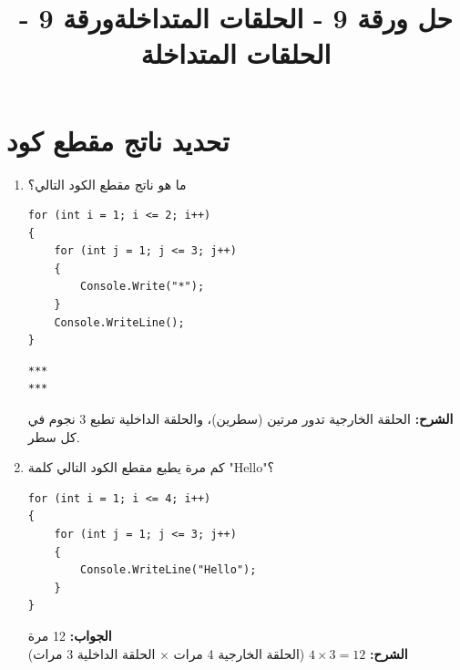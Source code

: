 \documentclass[14pt]{extarticle}
\title{حل ورقة 9 - الحلقات المتداخلة}
\title{ورقة 9 - الحلقات المتداخلة}
\begin{document}
\maketitle
\thispagestyle{fancy}

\section{تحديد ناتج مقطع كود}
\begin{enumerate}[itemsep=2em]

    \item
    ما هو ناتج مقطع الكود التالي؟
    \begin{boxCode}
    \begin{english}
    \begin{verbatim}
for (int i = 1; i <= 2; i++)
{
    for (int j = 1; j <= 3; j++)
    {
        Console.Write("*");
    }
    Console.WriteLine();
}
    \end{verbatim}
    \end{english}
    \end{boxCode}
    \ifwithsols
    \begin{boxSolution}
    \begin{english}
    \begin{boxCode}
\begin{verbatim}
***
***
    \end{verbatim}
\end{boxCode}
    \end{english}
    \textbf{الشرح:} الحلقة الخارجية تدور مرتين (سطرين)، والحلقة الداخلية تطبع 3 نجوم في كل سطر.
    \end{boxSolution}
    \clearpage
    \fi

    \item
    كم مرة يطبع مقطع الكود التالي كلمة \textenglish{"Hello"}؟
    \begin{boxCode}
    \begin{english}
    \begin{verbatim}
for (int i = 1; i <= 4; i++)
{
    for (int j = 1; j <= 3; j++)
    {
        Console.WriteLine("Hello");
    }
}
    \end{verbatim}
    \end{english}
    \end{boxCode}
    \ifwithsols
    \begin{boxSolution}
    \textbf{الجواب:} 12 مرة\\
    \textbf{الشرح:} $4 \times 3 = 12$ (الحلقة الخارجية 4 مرات × الحلقة الداخلية 3 مرات)
    \end{boxSolution}
    \fi


\end{enumerate}
\end{document}
